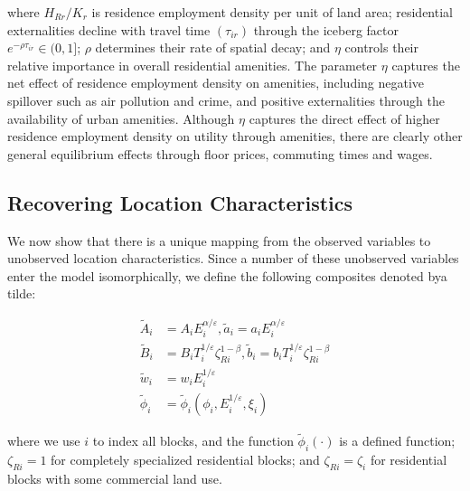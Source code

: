 where $H_{Rr} / K_r$ is residence employment density per unit of land area; residential externalities decline with travel time $(\tau_{ir})$ through the iceberg factor $e^{-\rho \tau_{ir}} \in (0, 1]$; $\rho$ determines their rate of spatial decay; and $\eta$ controls their relative importance in overall residential amenities. The parameter $\eta$ captures the net effect of residence employment density on amenities, including negative spillover such as air pollution and crime, and positive externalities through the availability of urban amenities. Although $\eta$ captures the direct effect of higher residence employment density on utility through amenities, there are clearly other general equilibrium effects through floor prices, commuting times and wages.

\subsection{Recovering Location Characteristics}

We now show that there is a unique mapping from the observed variables to unobserved location characteristics. Since a number of these unobserved variables enter the model isomorphically, we define the following composites denoted bya tilde:

\begin{equation*}
  \begin{aligned}
    \tilde{A}_i & = A_i E_i^{\alpha / \varepsilon}, \tilde{a}_i = a_i E_i^{\alpha / \varepsilon} \\
    \tilde{B}_i & = B_i T_i^{1/\varepsilon} \zeta_{Ri}^{1 - \beta}, \tilde{b}_i = b_i T_i^{1 / \varepsilon} \zeta_{Ri}^{1 - \beta} \\
    \tilde{w}_i & = w_i E_i^{1 / \varepsilon} \\
    \tilde{\phi}_i & = \tilde{\phi}_i(\phi_i, E_i^{1 / \varepsilon}, \xi_i)
  \end{aligned}
\end{equation*}

where we use $i$ to index all blocks, and the function $\tilde{\phi}_i(\cdot)$ is a defined function; $\zeta_{Ri} = 1$ for completely specialized residential blocks; and $\zeta_{Ri} = \zeta_i$ for residential blocks with some commercial land use.

